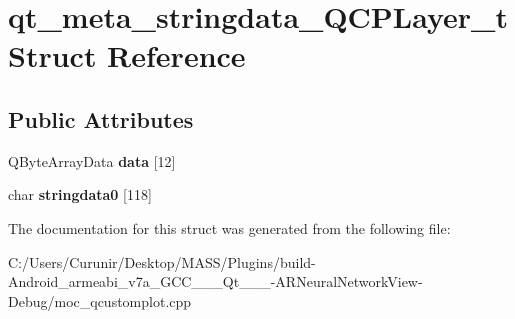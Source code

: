 \hypertarget{structqt__meta__stringdata___q_c_p_layer__t}{}\section{qt\+\_\+meta\+\_\+stringdata\+\_\+\+Q\+C\+P\+Layer\+\_\+t Struct Reference}
\label{structqt__meta__stringdata___q_c_p_layer__t}
\subsection*{Public Attributes}
\begin{DoxyCompactItemize}
\item 
\mbox{\label{structqt__meta__stringdata___q_c_p_layer__t_a656d123543ab744e31fb9443e13c48ea}} 
Q\+Byte\+Array\+Data {\bfseries data} \mbox{[}12\mbox{]}
\item 
\mbox{\label{structqt__meta__stringdata___q_c_p_layer__t_a6091b4bbbf0f2c4b9bf73a33dab0b91d}} 
char {\bfseries stringdata0} \mbox{[}118\mbox{]}
\end{DoxyCompactItemize}


The documentation for this struct was generated from the following file\+:\begin{DoxyCompactItemize}
\item 
C\+:/\+Users/\+Curunir/\+Desktop/\+M\+A\+S\+S/\+Plugins/build-\/\+Android\+\_\+armeabi\+\_\+v7a\+\_\+\+G\+C\+C\+\_\+\_\+\_\+\+Qt\+\_\+\_\+\_-\/\+A\+R\+Neural\+Network\+View-\/\+Debug/moc\+\_\+qcustomplot.\+cpp\end{DoxyCompactItemize}
